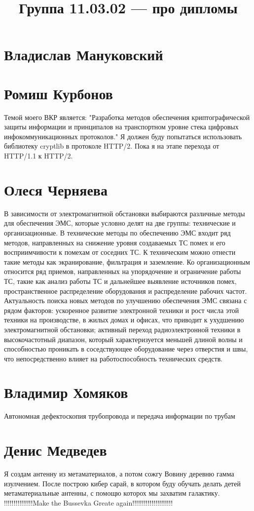 \documentclass{article}
\title{Группа 11.03.02 --- про дипломы}
\begin{document}
\section*{Владислав Мануковский}

\section*{Ромиш Курбонов}

Темой моего ВКР является: "Разработка методов обеспечения криптографической защиты информации и принципалов на транспортном уровне стека цифровых инфокоммуникационных протоколов."
Я должен буду попытаться использовать библиотеку cryptlib в протоколе HTTP/2. Пока я на этапе перехода от HTTP/1.1 к HTTP/2.

\section*{Олеся Черняева}
В зависимости от электромагнитной обстановки выбираются различные методы для обеспечения ЭМС, которые условно делят на две группы: технические и организационные. В технические методы по обеспечению ЭМС входит ряд методов, направленных на снижение уровня создаваемых ТС помех и его восприимчивости к помехам от соседних ТС. К техническим можно отнести такие методы как экранирование, фильтрация и заземление. Ко организационным относится ряд приемов, направленных на упорядочение и ограничение работы ТС, такие как анализ работы ТС и дальнейшее выявление источников помех, пространственное распределение оборудования и распределение рабочих частот. 
Актуальность поиска новых методов по улучшению обеспечения ЭМС связана с рядом факторов: ускоренное развитие электронной техники и рост числа этой техники на производстве, в жилых домах и офисах, что приводит к ухудшению электромагнитной обстановки; активный переход радиоэлектронной техники в высокочастотный диапазон, который характеризуется меньшей длиной волны и способностью проникать в соседствующее оборудование через отверстия и швы, что непосредственно влияет на работоспособность технических средств. 

\section*{Владимир Хомяков} 
Автономная дефектоскопия трубопровода и передача информации по трубам

\section*{Денис Медведев}
Я создам антенну из метаматериалов, а потом сожгу Вовину деревню гамма изулчением. После построю кибер сарай, в котором буду обучать делать детей метаматериальные антенны, с помощю которох мы захватим галактику. !!!!!!!!!!!!!!!Make the Bussevka Greate again!!!!!!!!!!!!!!!!!!!!!
\end{document}
